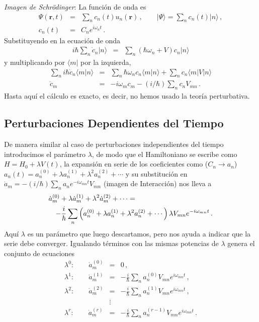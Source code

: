 \documentclass[twocolumn,aps,eqsecnum]{revtex4}
\newcommand{\mbr}{\mathbf{r}}
\providecommand{\bra}[1]{\langle #1 \rvert}
\providecommand{\ket}[1]{\lvert #1 \rangle}
\providecommand{\braket}[2]{\langle #1 \rvert #2 \rangle}
\begin{document}
\textit{Imagen de Schr\"odinger}: La funci\'on de onda es 
%
\begin{eqnarray} 
\Psi(\mbr,t) &=& \sum_n c_n (t) u_n (\mbr) \,,	\qquad 
	 \ket{\Psi} = \sum_n c_n (t)  \ket{n} \,,		\nonumber \\ 
 c_n (t) &=& C_n e^{i \omega_n t} 	\,.
\end{eqnarray}
Substituyendo en la ecuaci\'on de onda 
%
\begin{eqnarray} 
i \hbar \sum_n  \dot{c}_n \ket{n} 
	&=& \sum_n (\hbar \omega_n +V) c_n  \ket{n} 	
\end{eqnarray}
y multiplicando por $\bra{m}$ por la izquierda, 
%
\begin{eqnarray} 	\label{eq:amplitudeEqsSP}
\sum_n i \hbar \dot{c}_n  \braket{m}{n} 
	&=&  \sum_n \hbar \omega_n c_n \braket{m}{n}
	 + \sum_n c_n  \bra{m} V \ket{n}  \nonumber \\ 
\dot{c}_m  &=& -i \omega_m c_m - (i/\hbar)  \sum_n c_n V_{mn} \,.
\end{eqnarray}
Hasta aqu\'i el c\'alculo es exacto, es decir, no hemos usado la teor\'ia 
perturbativa. 


\subsection{Perturbaciones Dependientes del Tiempo} 
De manera similar al caso de perturbaciones independientes del tiempo 
introducimos el par\'ametro $\lambda$, de modo que el Hamiltoniano se 
escribe como $H = H_0 + \lambda V(t)$, la expansi\'on en serie de los 
coeficientes como ($C_n \to a_n$) 
$a_n (t) = a_n^{(0)} + \lambda a_n^{(1)} + \lambda^2 a_n^{(2)} + \cdots$ 
y su substituci\'on en  
$\dot{a}_m = - (i/\hbar) \sum_n a_n e^{-i \omega_{mn} t} V_{mn}$ (imagen 
de Interacci\'on) nos lleva a  
%
\begin{eqnarray} 
\lefteqn{ \dot{a}_m^{(0)} + \lambda \dot{a}_m^{(1)} 
	+ \lambda^2 \dot{a}_m^{(2)} + \cdots = } 	\\ 
&& - \frac{i}{\hbar} \sum_n \left( a_n^{(0)} + \lambda a_n^{(1)} 
  	+ \lambda^2 a_n^{(2)} + \cdots \right) \lambda V_{mn} 
  	e^{-i \omega_{mn} t} \,. \nonumber \\
\end{eqnarray}
Aqu\'i $\lambda$ es un par\'ametro que luego descartamos, pero nos ayuda 
a indicar que la serie debe converger. Igualando t\'erminos con las mismas 
potencias de $\lambda$ genera el conjunto de ecuaciones
%
\begin{subequations}
\begin{eqnarray} 
\lambda^0 : \qquad \dot{a}_m^{(0)} &=& 0 	\,, 	\\
\lambda^1 : \qquad \dot{a}_m^{(1)} 
 	&=& - \frac{i}{\hbar} \sum_n a_n^{(0)} V_{mn} e^{i \omega_{mn} t} \,, \\ 
\lambda^2 : \qquad \dot{a}_m^{(2)} 
 	&=& - \frac{i}{\hbar} \sum_n a_n^{(1)} V_{mn} e^{i \omega_{mn} t} \,, \\ 
&\vdots& 	\nonumber \\ 
\lambda^r : \qquad \dot{a}_m^{(r)} 
 	&=& - \frac{i}{\hbar} \sum_n a_n^{(r-1)} V_{mn} e^{i \omega_{mn} t} \,. 
\end{eqnarray}
\end{subequations}
\end{document}
